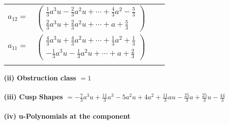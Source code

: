 \documentclass[1p]{elsarticle_modified}
\theoremstyle{definition}
\begin{document}
\begin{tabular}{m{7pt} m{180pt} m{7pt} m{180pt} }
\flushright $a_{12}=$&$\begin{pmatrix}\frac{1}{3} a^3 u-\frac{2}{3} a^2 u+\cdots+\frac{4}{3} a^2-\frac{5}{3}\\\frac{2}{3} a^3 u+\frac{2}{3} a^2 u+\cdots+a+\frac{5}{3}\end{pmatrix}$ \\
\flushright $a_{11}=$&$\begin{pmatrix}\frac{4}{3} a^3 u+\frac{4}{3} a^2 u+\cdots+\frac{1}{3} a^2+\frac{1}{3}\\-\frac{1}{3} a^3 u-\frac{1}{3} a^2 u+\cdots+a+\frac{2}{3}\end{pmatrix}$\\&\end{tabular}
\flushleft \textbf{(ii) Obstruction class $= 1$}\\~\\
\flushleft \textbf{(iii) Cusp Shapes $= -\frac{7}{3} a^3 u+\frac{11}{3} a^3-5 a^2 u+4 a^2+\frac{11}{3} a u-\frac{25}{3} a+\frac{25}{3} u-\frac{44}{3}$}\\~\\
\newpage\renewcommand{\arraystretch}{1}
\flushleft \textbf{(iv) u-Polynomials at the component}\newline \\
\end{document}
